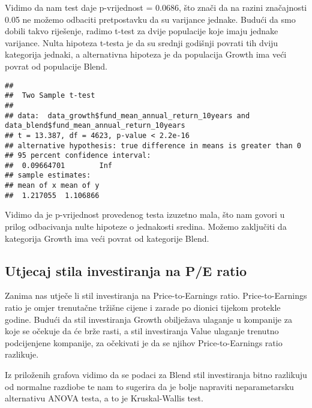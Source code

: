 \documentclass[
]{article}
\newenvironment{Shaded}{\begin{snugshade}}{\end{snugshade}}
\newcommand{\DataTypeTok}[1]{\textcolor[rgb]{0.13,0.29,0.53}{#1}}
\newcommand{\KeywordTok}[1]{\textcolor[rgb]{0.13,0.29,0.53}{\textbf{#1}}}
\newcommand{\NormalTok}[1]{#1}
\newcommand{\OperatorTok}[1]{\textcolor[rgb]{0.81,0.36,0.00}{\textbf{#1}}}
\newcommand{\OtherTok}[1]{\textcolor[rgb]{0.56,0.35,0.01}{#1}}
\newcommand{\StringTok}[1]{\textcolor[rgb]{0.31,0.60,0.02}{#1}}
\begin{document}
Vidimo da nam test daje p-vrijednost = 0.0686, što znači da na razini
značajnosti 0.05 ne možemo odbaciti pretpostavku da su varijance
jednake. Budući da smo dobili takvo riješenje, radimo t-test za dvije
populacije koje imaju jednake varijance. Nulta hipoteza t-testa je da su
srednji godišnji povrati tih dviju kategorija jednaki, a alternativna
hipoteza je da populacija Growth ima veći povrat od populacije Blend.

\begin{Shaded}
\end{Shaded}

\begin{verbatim}
## 
##  Two Sample t-test
## 
## data:  data_growth$fund_mean_annual_return_10years and data_blend$fund_mean_annual_return_10years
## t = 13.387, df = 4623, p-value < 2.2e-16
## alternative hypothesis: true difference in means is greater than 0
## 95 percent confidence interval:
##  0.09664701        Inf
## sample estimates:
## mean of x mean of y 
##  1.217055  1.106866
\end{verbatim}

Vidimo da je p-vrijednost provedenog testa izuzetno mala, što nam govori
u prilog odbacivanja nulte hipoteze o jednakosti sredina. Možemo
zaključiti da kategorija Growth ima veći povrat od kategorije Blend.

\hypertarget{utjecaj-stila-investiranja-na-pe-ratio}{%
\subsection{Utjecaj stila investiranja na P/E
ratio}\label{utjecaj-stila-investiranja-na-pe-ratio}}

Zanima nas utječe li stil investiranja na Price-to-Earnings ratio.
Price-to-Earnings ratio je omjer trenutačne tržišne cijene i zarade po
dionici tijekom protekle godine. Budući da stil investiranja Growth
obilježava ulaganje u kompanije za koje se očekuje da će brže rasti, a
stil investiranja Value ulaganje trenutno podcijenjene kompanije, za
očekivati je da se njihov Price-to-Earnings ratio razlikuje.

Iz priloženih grafova vidimo da se podaci za Blend stil investiranja
bitno razlikuju od normalne razdiobe te nam to sugerira da je bolje
napraviti neparametarsku alternativu ANOVA testa, a to je Kruskal-Wallis
test.
\end{document}
